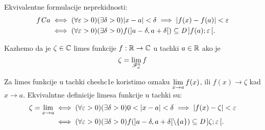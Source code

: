 \documentclass[../maing.tex]{subfiles}
\begin{document}
    Ekvivalentne formulacije neprekidnosti: 
    \begin{align*}
        f \mathit{C} a &\iff (\forall \varepsilon> 0)(\exists \delta > 0) |x-a|<\delta \implies |f(x)-f(a)|<\varepsilon \\
                  &\iff (\forall \varepsilon> 0)(\exists \delta > 0) f(]a-\delta,a+\delta[)\subseteq \mathit{D}\,]f(a);\varepsilon\,[.
    \end{align*}

    \begin{de}\label{deflimfje}
    Kazhemo da je $\zeta \in \mathbb{C}$ limes funkcije $f:\mathbb{R}\to\mathbb{C}$ u tachki $a\in\mathbb{R}$ ako je $$\zeta=\displaystyle{\lim_{\mathscr{F}_a^0}f}$$
        \end{de}
    Za limes funkcije u tachki chesh\-c1e koristimo oznaku $\displaystyle{\lim_{x \to a}f(x)}$, ili $f(x)\to \zeta$ kad $x\to a$. Ekvivalntne definicije limesa funkcije u tachki su: 
    \begin{align*}
        \zeta= \lim_{x\to a} &\iff(\forall \eps> 0)(\exists \delta > 0) 0<|x-a|<\delta \implies |f(x)-\zeta|<\eps\\
                             &\iff(\forall \eps> 0)(\exists \delta > 0) f(]a-\delta,a+\delta[\setminus \{a\})\psj \od{\zeta}{\eps}.
    \end{align*}
\end{document}
